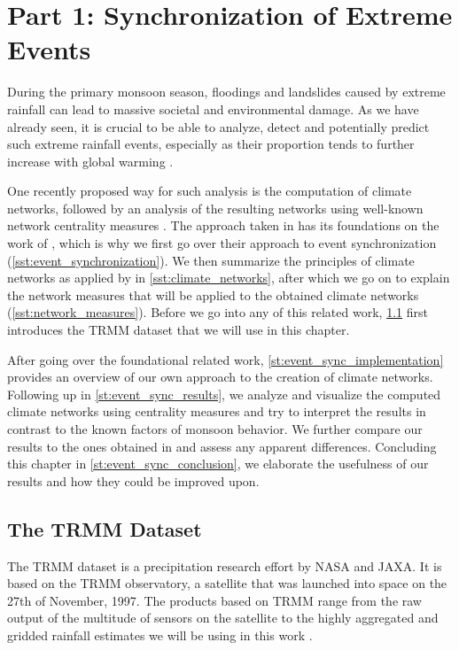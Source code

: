 \chapter{Part 1: Synchronization of Extreme Events}
\label{c:event_sync}
During the primary monsoon season, floodings and landslides caused by extreme rainfall can lead to massive societal and environmental damage. As we have already seen, it is crucial to be able to analyze, detect and potentially predict such extreme rainfall events, especially as their proportion tends to further increase with global warming \citep{Stolbova.2015}.

One recently proposed way for such analysis is the computation of climate networks, followed by an analysis of the resulting networks using well-known network centrality measures \citep{Stolbova.2015}. The approach taken in \citet{Stolbova.2015} has its foundations on the work of \citet{QuianQuiroga.2002}, which is why we first go over their approach to event synchronization (\cref{sst:event_synchronization}). We then summarize the principles of climate networks as applied by \citet{Stolbova.2015} in \cref{sst:climate_networks}, after which we go on to explain the network measures that will be applied to the obtained climate networks (\cref{sst:network_measures}). Before we go into any of this related work, \cref{st:trmm_dataset} first introduces the TRMM dataset that we will use in this chapter.

After going over the foundational related work, \cref{st:event_sync_implementation} provides an overview of our own approach to the creation of climate networks. Following up in \cref{st:event_sync_results}, we analyze and visualize the computed climate networks using centrality measures and try to interpret the results in contrast to the known factors of monsoon behavior. We further compare our results to the ones obtained in \citet{Stolbova.2015} and assess any apparent differences. Concluding this chapter in \cref{st:event_sync_conclusion}, we elaborate the usefulness of our results and how they could be improved upon.


\section{The TRMM Dataset}
\label{st:trmm_dataset}
The TRMM dataset is a precipitation research effort by NASA and JAXA. It is based on the TRMM observatory, a satellite that was launched into space on the 27th of November, 1997. The products based on TRMM range from the raw output of the multitude of sensors on the satellite to the highly aggregated and gridded rainfall estimates we will be using in this work \citep{GoddardEarthScienceDataInformationandServicesCenter.2016}.


